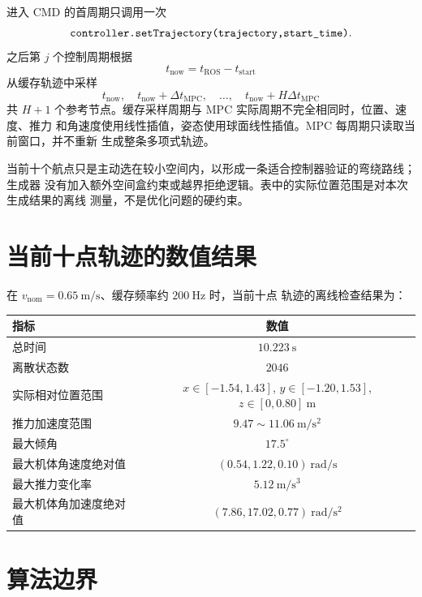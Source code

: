 \documentclass[UTF8,a4paper,11pt]{ctexart}
\newcommand{\code}[1]{\texttt{\detokenize{#1}}}
\begin{document}
进入 CMD 的首周期只调用一次
\begin{equation}
  \code{controller.setTrajectory(trajectory,start_time)}.
\end{equation}
之后第 $j$ 个控制周期根据
\begin{equation}
  t_{\mathrm{now}}=t_{\mathrm{ROS}}-t_{\mathrm{start}}
\end{equation}
从缓存轨迹中采样
\begin{equation}
  t_{\mathrm{now}},\quad
  t_{\mathrm{now}}+\Delta t_{\mathrm{MPC}},\quad\ldots,\quad
  t_{\mathrm{now}}+H\Delta t_{\mathrm{MPC}}
\end{equation}
共 $H+1$ 个参考节点。缓存采样周期与 MPC 实际周期不完全相同时，位置、速度、推力
和角速度使用线性插值，姿态使用球面线性插值。MPC 每周期只读取当前窗口，并不重新
生成整条多项式轨迹。

当前十个航点只是主动选在较小空间内，以形成一条适合控制器验证的弯绕路线；生成器
没有加入额外空间盒约束或越界拒绝逻辑。表中的实际位置范围是对本次生成结果的离线
测量，不是优化问题的硬约束。

\section{当前十点轨迹的数值结果}

在 $v_{\mathrm{nom}}=0.65\ \mathrm{m/s}$、缓存频率约 $200\ \mathrm{Hz}$ 时，当前十点
轨迹的离线检查结果为：
\begin{center}
\begin{tabular}{lc}
\toprule
指标 & 数值\\
\midrule
总时间 & $10.223\ \mathrm{s}$\\
离散状态数 & $2046$\\
实际相对位置范围 & $x\in[-1.54,1.43]$, $y\in[-1.20,1.53]$, $z\in[0,0.80]\ \mathrm m$\\
推力加速度范围 & $9.47\sim11.06\ \mathrm{m/s^2}$\\
最大倾角 & $17.5^\circ$\\
最大机体角速度绝对值 & $(0.54,1.22,0.10)\ \mathrm{rad/s}$\\
最大推力变化率 & $5.12\ \mathrm{m/s^3}$\\
最大机体角加速度绝对值 & $(7.86,17.02,0.77)\ \mathrm{rad/s^2}$\\
\bottomrule
\end{tabular}
\end{center}

\section{算法边界}
\end{document}
